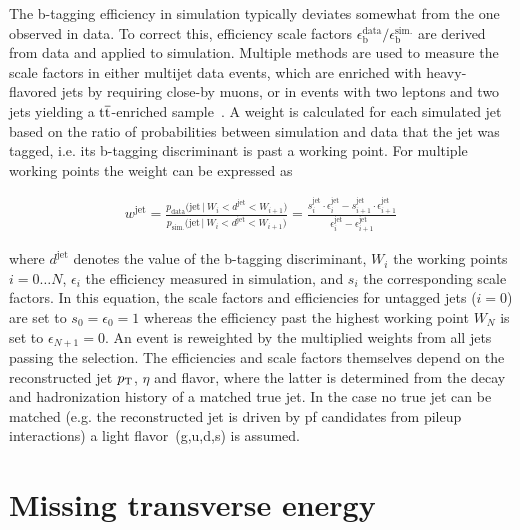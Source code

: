 
The b-tagging efficiency in simulation typically deviates somewhat from the one observed in data. To correct this, efficiency scale factors $\epsilon_\mathrm{b}^\mathrm{data}/\epsilon_\mathrm{b}^\mathrm{sim.}$ are derived from data and applied to simulation. Multiple methods are used to measure the scale factors in either multijet data events, which are enriched with heavy-flavored jets by requiring close-by muons, or in events with two leptons and two jets yielding a $\ttbar$-enriched sample~\cite{CMS-PAS-BTV-13-001}. A weight is calculated for each simulated jet based on the ratio of probabilities between simulation and data that the jet was tagged, i.e. its b-tagging discriminant is past a working point. For multiple working points the weight can be expressed as

\begin{align}
w^\mathrm{jet}=\frac{p_\mathrm{data}\big(\mathrm{jet}\,\big|~W_{i}<d^\mathrm{jet}<W_{i+1}\big)}{p_\mathrm{sim.}\big(\mathrm{jet}\,\big|~W_{i}<d^\mathrm{jet}<W_{i+1}\big)}
=\frac{
s^\mathrm{jet}_{i}\cdot\epsilon^\mathrm{jet}_{i}-s^\mathrm{jet}_{i+1}\cdot\epsilon^\mathrm{jet}_{i+1}}{\epsilon^\mathrm{jet}_{i}-\epsilon^\mathrm{jet}_{i+1}}
\end{align}

where $d^\mathrm{jet}$ denotes the value of the b-tagging discriminant, $W_{i}$ the working points $i=0\ldots N$, $\epsilon_i$ the efficiency measured in simulation, and $s_i$ the corresponding scale factors. In this equation, the scale factors and efficiencies for untagged jets ($i=0$) are set to $s_{0}=\epsilon_{0}=1$ whereas the efficiency past the highest working point $W_N$ is set to $\epsilon_{N+1}=0$. An event is reweighted by the multiplied weights from all jets passing the selection. The efficiencies and scale factors themselves depend on the reconstructed jet $p_\textrm{T}$, $\eta$ and flavor, where the latter is determined from the decay and hadronization history of a matched true jet. In the case no true jet can be matched (e.g. the reconstructed jet is driven by \gls{pf} candidates from pileup interactions) a light flavor~(g,u,d,s) is assumed.



 
\section{Missing transverse energy}

